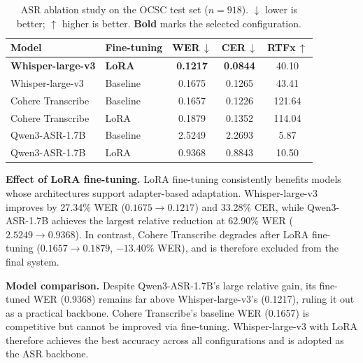 \documentclass{article}
\begin{document}
\begin{table}[t]
  \centering
  \caption{ASR ablation study on the OCSC test set ($n = 918$).
           $\downarrow$ lower is better; $\uparrow$ higher is better.
           \textbf{Bold} marks the selected configuration.}
  \label{tab:asr-ablation}
  \setlength{\tabcolsep}{5pt}
  \begin{tabular}{llccc}
    \toprule
    \textbf{Model} & \textbf{Fine-tuning}
      & \textbf{WER\,$\downarrow$}
      & \textbf{CER\,$\downarrow$}
      & \textbf{RTFx\,$\uparrow$} \\
    \midrule
    \textbf{Whisper-large-v3} & \textbf{LoRA}
      & \textbf{0.1217} & \textbf{0.0844} & 40.10 \\
    Whisper-large-v3          & Baseline
      & 0.1675          & 0.1265          & 43.41 \\
    \midrule
    Cohere Transcribe         & Baseline
      & 0.1657          & 0.1226          & 121.64 \\
    Cohere Transcribe         & LoRA
      & 0.1879          & 0.1352          & 114.04 \\
    \midrule
    Qwen3-ASR-1.7B            & Baseline
      & 2.5249          & 2.2693          & 5.87 \\
    Qwen3-ASR-1.7B            & LoRA
      & 0.9368          & 0.8843          & 10.50 \\
    \bottomrule
  \end{tabular}
\end{table}
 
\noindent\textbf{Effect of LoRA fine-tuning.}
LoRA fine-tuning consistently benefits models whose architectures
support adapter-based adaptation.
Whisper-large-v3 improves by 27.34\% WER ($0.1675 \to 0.1217$) and
33.28\% CER, while Qwen3-ASR-1.7B achieves the largest relative
reduction at 62.90\% WER ($2.5249 \to 0.9368$).
In contrast, Cohere Transcribe degrades after LoRA fine-tuning
($0.1657 \to 0.1879$, $-13.40\%$ WER), and is therefore excluded
from the final system.
 
\noindent\textbf{Model comparison.}
Despite Qwen3-ASR-1.7B's large relative gain, its fine-tuned
WER (0.9368) remains far above Whisper-large-v3's (0.1217), ruling
it out as a practical backbone.
Cohere Transcribe's baseline WER (0.1657) is competitive but
cannot be improved via fine-tuning.
Whisper-large-v3 with LoRA therefore achieves the best accuracy
across all configurations and is adopted as the ASR backbone.
 
\end{document}
